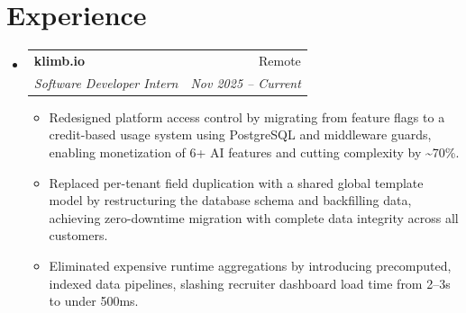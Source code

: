 \documentclass[letterpaper,10pt]{article}
\makeatletter
\newenvironment{resumeList}{
  \begin{itemize}[leftmargin=0.15in, label={}]
}{
  \end{itemize}
}
\newcommand{\resumeItem}[1]{
  \item\small{
    {#1 \vspace{-2.5pt}}
  }
}
\newcommand{\resumeSubheading}[4]{
  \vspace{-2pt}\item
    \begin{tabular*}{0.97\textwidth}[t]{l@{\extracolsep{\fill}}r}
      \textbf{#1} & #2 \\
      \textit{\small#3} & \textit{\small #4} \\
    \end{tabular*}\vspace{-6pt}
}
\newcommand{\resumeItemListStart}{\begin{itemize}[leftmargin=0.15in]}
\newcommand{\resumeItemListEnd}{\end{itemize}\vspace{-5pt}}
\makeatother
\begin{document}
\section{Experience}
\begin{resumeList}
    \resumeSubheading
    {klimb.io}{Remote}
    {Software Developer Intern}{Nov 2025 – Current}
  \resumeItemListStart
    \resumeItem{Redesigned platform access control by migrating from feature flags to a credit-based usage system using PostgreSQL and middleware guards, enabling monetization of 6+ AI features and cutting complexity by \textasciitilde{}70\%.}
    \resumeItem{Replaced per-tenant field duplication with a shared global template model by restructuring the database schema and backfilling data, achieving zero-downtime migration with complete data integrity across all customers.}
    \resumeItem{Eliminated expensive runtime aggregations by introducing precomputed, indexed data pipelines, slashing recruiter dashboard load time from 2–3s to under 500ms.}
  \resumeItemListEnd
\end{resumeList}

\end{document}
